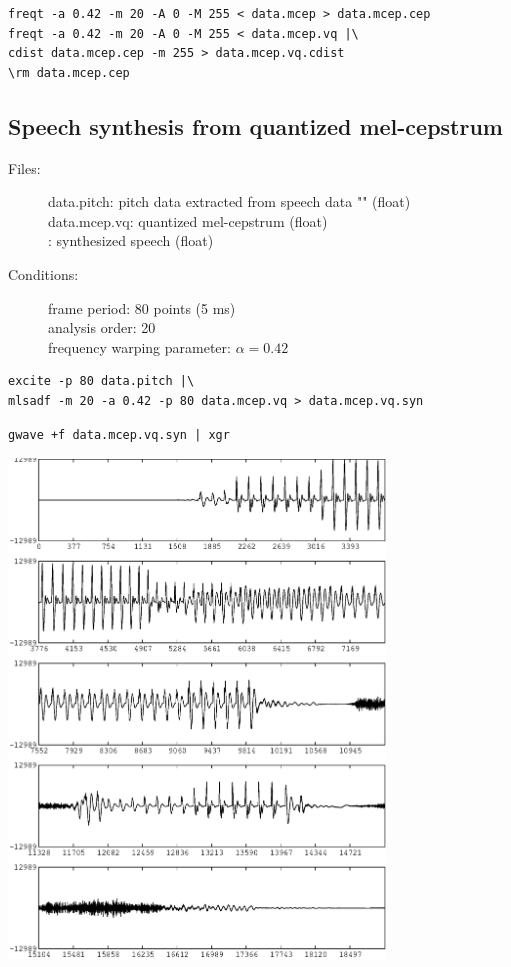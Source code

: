 \documentclass[a4paper,10pt]{article}
\begin{document}
\begin{verbatim}
freqt -a 0.42 -m 20 -A 0 -M 255 < data.mcep > data.mcep.cep
freqt -a 0.42 -m 20 -A 0 -M 255 < data.mcep.vq |\
cdist data.mcep.cep -m 255 > data.mcep.vq.cdist
\rm data.mcep.cep
\end{verbatim}

\subsection{Speech synthesis from quantized mel-cepstrum}

\begin{description}
\item[Files:]
  data.pitch: pitch data extracted from speech data
           ""
           (float)\\
  data.mcep.vq: quantized mel-cepstrum (float) \\
  :
  synthesized speech (float)
\item[Conditions:]
  frame period: 80 points (5 ms)\\
  analysis order: 20 \\
  frequency warping parameter: $\alpha = 0.42$
\end{description}

\begin{verbatim}
excite -p 80 data.pitch |\
mlsadf -m 20 -a 0.42 -p 80 data.mcep.vq > data.mcep.vq.syn
\end{verbatim}

\begin{verbatim}
gwave +f data.mcep.vq.syn | xgr
\end{verbatim}

\includegraphics[width=10cm]{eps/data.mcep.vq.syn.gwave.eps}
\end{document}
